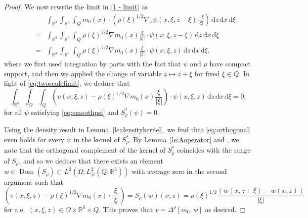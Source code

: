 \documentclass[reqno,11pt]{amsart}
\numberwithin{equation}{section}
\theoremstyle{thmlemcorr}
\numberwithin{theorem}{section}
\theoremstyle{thmlemcorr*}
\theoremstyle{defi}
\theoremstyle{remexample}
\theoremstyle{ass}
\newcommand{\R}{\mathbb{R}}
\renewcommand{\epsilon}{\varepsilon}
\newcommand{\dd}{\,\mathrm{d}}
\newcommand{\1}{\mathds{1}}
\DeclareMathOperator{\Dom}{Dom}
\newcommand{\veps}{\varepsilon}
\begin{document}
\begin{proof}
    We now rewrite the limit in \eqref{1 - limit} as
    \begin{align*} &\int_{\R^3}\int_{\R^3}\int_{Q}m_0(x) \cdot \left(\rho(\xi)^{1/2}\nabla_x \psi(x,\xi,z-\xi)\frac{-\xi}{|\xi|}\right)\dd z\dd x\dd \xi %
    \\
    \qquad = &\int_{\R^3}\int_{\R^3}\int_{Q}\rho(\xi)^{1/2}\nabla m_0(x) \frac{\xi}{|\xi|}\cdot \psi(x,\xi,z-\xi)\dd z\dd x\dd \xi %
    \\
    \qquad = &\int_{\R^3}\int_{\R^3}\int_{Q}\rho(\xi)^{1/2}\nabla m_0(x) \frac{\xi}{|\xi|}\cdot \psi(x,\xi,z)\dd z\dd x\dd \xi, %
    \end{align*}
    where %
    we first used integration by parts with the fact that $\psi$ and $\rho$ have compact support, and then we applied the change of variable $z \mapsto z + \xi$ for fixed $\xi \in Q$. 
    In light of \eqref{eq:twoscalelimit}, we deduce that
    \begin{equation}\label{eq:orthogonal}
    \int_{\R^3} \int_{\Omega} \int_{Q}\left(v(x,\xi,z)-\rho(\xi)^{1/2}\nabla m_0(x) \frac{\xi}{|\xi|}\right)\cdot \psi(x,\xi,z)\dd z\dd x\dd \xi=0,
    \end{equation}
    for all $\psi$ satisfying \eqref{eq:smoothpsi} and $S_\rho^*(\psi)=0$. 
    
    Using the density result in Lemma~\ref{le:densitykernel}, we find that \eqref{eq:orthogonal} even holds for every $\psi$ in the kernel of $S_\rho^*$. By Lemma~\ref{le:Aoperator} and \cite[Theorem~2.19\,(iii)]{Bre11}, we note that the orthogonal complement of the kernel of $S_\rho^*$ coincides with the range of $S_\rho$, and so we deduce that there exists an element $w \in \Dom(S_\rho)\subset L^2(\Omega ;L^2_{\#}(Q;\R^3)) $ with average zero in the second argument such that
    \begin{equation}\label{eq:identification-limit}
    \left(v(x,\xi,z)-\rho(\xi)^{1/2}\nabla m_0(x)\cdot \frac{\xi}{|\xi|}\right)=S_\rho(w)(x,z) = \rho(\xi)^{1/2}\frac{(w(x,z+\xi)-w(x,z))}{|\xi|} 
    \end{equation}
    for a.e.~$(x,\xi,z) \in \Omega\times \R^3\times Q$. This proves that $v=\Delta^\rho[m_0,w]$ as desired.\medskip



\end{proof}
\end{document}
